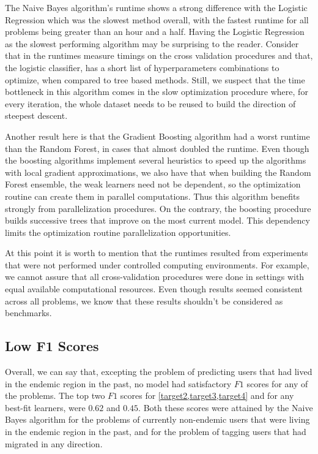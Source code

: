 The Naive Bayes algorithm's runtime shows a strong difference with the Logistic Regression which was the slowest method overall, with the fastest runtime for all problems being greater than an hour and a half.
Having the Logistic Regression as the slowest performing algorithm may be surprising to the reader.
Consider that in the runtimes measure timings on the cross validation procedures and that, the logistic classifier, has a short list of hyperparameters combinations to optimize, when compared to tree based methods.
Still, we suspect that the time bottleneck in this algorithm comes in the slow optimization procedure where, for every iteration, the whole dataset needs to be reused to build the direction of steepest descent.

Another result here is that the Gradient Boosting algorithm had a worst runtime than the Random Forest, in cases that almost doubled the runtime.
Even though the boosting algorithms implement several heuristics to speed up the algorithms with local gradient approximations, we also have that when building the Random Forest ensemble, the weak learners need not be dependent, so the optimization routine can create them in parallel computations.
Thus this algorithm benefits strongly from parallelization procedures.
On the contrary, the boosting procedure builds successive trees that improve on the most current model.
This dependency limits the optimization routine parallelization opportunities.

At this point it is worth to mention that the runtimes resulted from experiments that were not performed under controlled computing environments.
For example, we cannot assure that all cross-validation procedures were done in settings with equal available computational resources.
Even though results seemed consistent across all problems, we know that these results shouldn't be considered as benchmarks.


\subsection{Low F1 Scores}\label{subsec:master_table_low_f1}

Overall, we can say that, excepting the problem of predicting users that had lived in the endemic region in the past, no model had satisfactory $F1$ scores for any of the problems. The top two $F1$ scores for \cref{target2,target3,target4} and for any best-fit learners, were $0.62$ and $0.45$.
Both these scores were attained by the Naive Bayes algorithm for the problems of currently non-endemic users that were living in the endemic region in the past, and for the problem of tagging users that had migrated in any direction.

